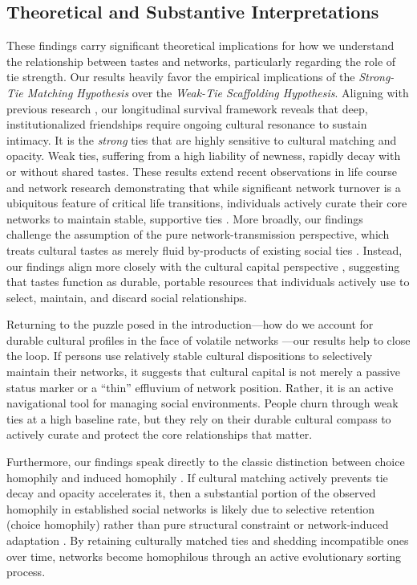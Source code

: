 \documentclass[
  letterpaper,
  DIV=11,
  numbers=noendperiod]{scrartcl}
\begin{document}
\subsection{Theoretical and Substantive Interpretations}
These findings carry significant theoretical implications for how we understand the relationship between tastes and networks, particularly regarding the role of tie strength. Our results heavily favor the empirical implications of the \textit{Strong-Tie Matching Hypothesis} over the \textit{Weak-Tie Scaffolding Hypothesis}. Aligning with previous research \citep{edelmann2014cultural-a77, vaisey2010}, our longitudinal survival framework reveals that deep, institutionalized friendships require ongoing cultural resonance to sustain intimacy. It is the \textit{strong} ties that are highly sensitive to cultural matching and opacity. Weak ties, suffering from a high liability of newness, rapidly decay with or without shared tastes. These results extend recent observations in life course and network research demonstrating that while significant network turnover is a ubiquitous feature of critical life transitions, individuals actively curate their core networks to maintain stable, supportive ties \citep{roy2022turnover, weiss2022life, kempnich2024how, vacchiano2024networked}. More broadly, our findings challenge the assumption of the pure network-transmission perspective, which treats cultural tastes as merely fluid by-products of existing social ties \citep{mark2003}. Instead, our findings align more closely with the cultural capital perspective \citep{bourdieu1984}, suggesting that tastes function as durable, portable resources that individuals actively use to select, maintain, and discard social relationships. 

Returning to the puzzle posed in the introduction---how do we account for durable cultural profiles in the face of volatile networks \citep{bourdieu1984, holt1998}---our results help to close the loop. If persons use relatively stable cultural dispositions to selectively maintain their networks, it suggests that cultural capital is not merely a passive status marker or a ``thin'' effluvium of network position. Rather, it is an active navigational tool for managing social environments. People churn through weak ties at a high baseline rate, but they rely on their durable cultural compass to actively curate and protect the core relationships that matter.

Furthermore, our findings speak directly to the classic distinction between choice homophily and induced homophily \citep{mcpherson2001}. If cultural matching actively prevents tie decay and opacity accelerates it, then a substantial portion of the observed homophily in established social networks is likely due to selective retention (choice homophily) rather than pure structural constraint or network-induced adaptation \citep{lizardo2006, lewis2018}. By retaining culturally matched ties and shedding incompatible ones over time, networks become homophilous through an active evolutionary sorting process.
\end{document}
